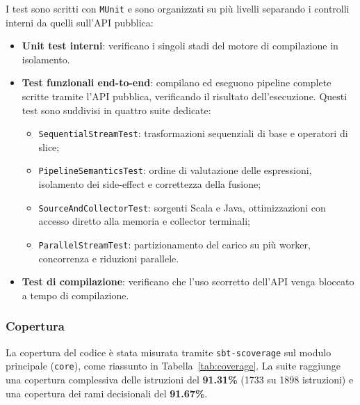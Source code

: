 \documentclass[a4paper,11pt]{report}
\theoremstyle{definition}
\begin{document}
I test sono scritti con \texttt{MUnit} e sono organizzati su più livelli separando i controlli interni da quelli sull'API pubblica:
\begin{itemize}
  \item \textbf{Unit test interni}: verificano i singoli stadi del motore di compilazione in isolamento.
  \item \textbf{Test funzionali end-to-end}: compilano ed eseguono pipeline complete scritte tramite l'API pubblica, verificando il risultato dell'esecuzione. Questi test sono suddivisi in quattro suite dedicate:
    \begin{itemize}
      \item \texttt{SequentialStreamTest}: trasformazioni sequenziali di base e operatori di slice;
      \item \texttt{PipelineSemanticsTest}: ordine di valutazione delle espressioni, isolamento dei side-effect e correttezza della fusione;
      \item \texttt{SourceAndCollectorTest}: sorgenti Scala e Java, ottimizzazioni con accesso diretto alla memoria e collector terminali;
      \item \texttt{ParallelStreamTest}: partizionamento del carico su più worker, concorrenza e riduzioni parallele.
    \end{itemize}
  \item \textbf{Test di compilazione}: verificano che l'uso scorretto dell'API venga bloccato a tempo di compilazione.
\end{itemize}

\subsubsection{Copertura}

La copertura del codice è stata misurata tramite \texttt{sbt-scoverage} sul modulo principale (\texttt{core}), come riassunto in Tabella~\ref{tab:coverage}. La suite raggiunge una copertura complessiva delle istruzioni del \textbf{91.31\%} (1733 su 1898 istruzioni) e una copertura dei rami decisionali del \textbf{91.67\%}.
\end{document}
